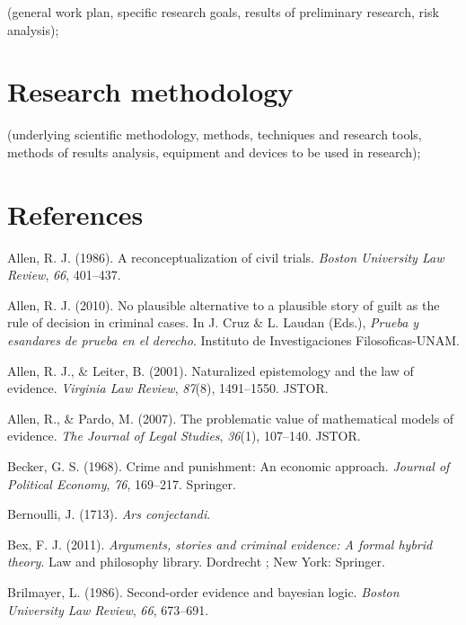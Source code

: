 \documentclass[11pt,dvipsnames,enabledeprecatedfontcommands]{scrartcl}
\begin{document}
(general work plan, specific research goals, results of preliminary
research, risk analysis);

\section{Research methodology}\label{research-methodology}

(underlying scientific methodology, methods, techniques and research
tools, methods of results analysis, equipment and devices to be used in
research);

\section*{References}\label{references}

\hypertarget{refs}{}
\hypertarget{ref-Allen1986A-Reconceptuali}{}
Allen, R. J. (1986). A reconceptualization of civil trials. \emph{Boston
University Law Review}, \emph{66}, 401--437.

\hypertarget{ref-Allen2010No-Plausible-Al}{}
Allen, R. J. (2010). No plausible alternative to a plausible story of
guilt as the rule of decision in criminal cases. In J. Cruz \& L. Laudan
(Eds.), \emph{Prueba y esandares de prueba en el derecho}. Instituto de
Investigaciones Filosoficas-UNAM.

\hypertarget{ref-allen2001naturalized}{}
Allen, R. J., \& Leiter, B. (2001). Naturalized epistemology and the law
of evidence. \emph{Virginia Law Review}, \emph{87}(8), 1491--1550.
JSTOR.

\hypertarget{ref-allen2007problematic}{}
Allen, R., \& Pardo, M. (2007). The problematic value of mathematical
models of evidence. \emph{The Journal of Legal Studies}, \emph{36}(1),
107--140. JSTOR.

\hypertarget{ref-becker1968crime}{}
Becker, G. S. (1968). Crime and punishment: An economic approach.
\emph{Journal of Political Economy}, \emph{76}, 169--217. Springer.

\hypertarget{ref-Bernoulli1713Ars-conjectandi}{}
Bernoulli, J. (1713). \emph{Ars conjectandi}.

\hypertarget{ref-bex2011ArgumentsStoriesCriminal}{}
Bex, F. J. (2011). \emph{Arguments, stories and criminal evidence: A
formal hybrid theory}. Law and philosophy library. Dordrecht ; New York:
Springer.

\hypertarget{ref-brilmayer1986}{}
Brilmayer, L. (1986). Second-order evidence and bayesian logic.
\emph{Boston University Law Review}, \emph{66}, 673--691.
\end{document}
